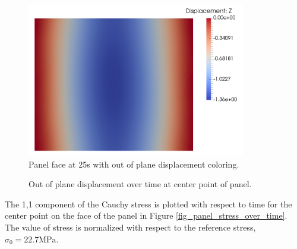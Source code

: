 \documentclass[conf]{new-aiaa}
\begin{document}
\begin{figure}[H] 
  \centering
    \includegraphics[width=0.85\textwidth, keepaspectratio]
    {panel_top_down_Z_solution}
  \caption{ Panel face at 25s with out of plane displacement coloring.}
  \label{fig_panel_top_down_Z_solution}
\end{figure}

\begin{figure}[H]
  \centering
  \caption{ Out of plane displacement over time at center point of panel.}
  \label{fig_panel_displacement_over_time}
\end{figure}

The 1,1 component of the Cauchy stress is plotted with respect to time
for the center point on the face of the panel in Figure \ref{fig_panel_stress_over_time}.
The value of stress is normalized with respect to the reference stress, 
$\sigma_0 = 22.7 \text{MPa}$.
\end{document}
